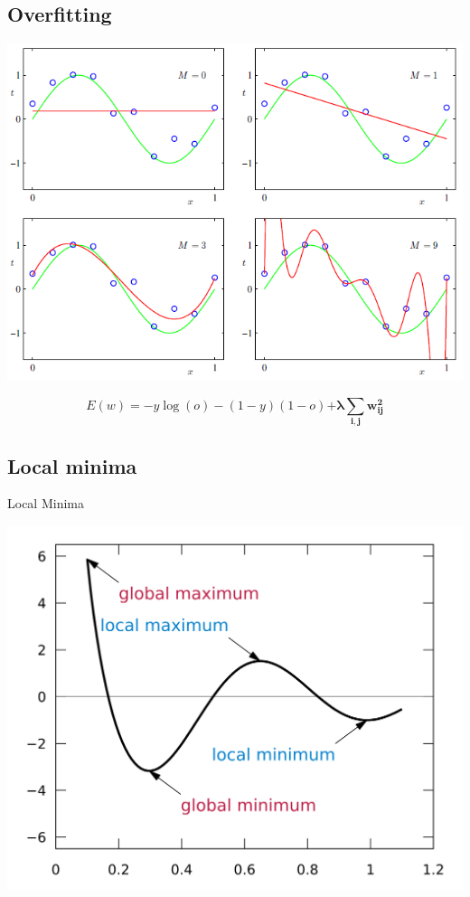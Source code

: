 \subsection{Overfitting}

\begin{frame}
  \begin{center}
    \includegraphics[scale=0.45]{./pictures/polynomials.png}
  \end{center}
\end{frame}

\begin{frame}
  \begin{equation*}
    E(w) = -y \log(o) - (1 - y)(1 - o) \mathbf{+ \lambda \displaystyle\sum_{i, j}{w_{ij}^2}}
  \end{equation*}
\end{frame}

\subsection{Local minima}

\begin{frame}[c]{Local Minima}
  \begin{center}
    \includegraphics[scale=0.095]{./pictures/local_minima.png}
  \end{center}
\end{frame}

